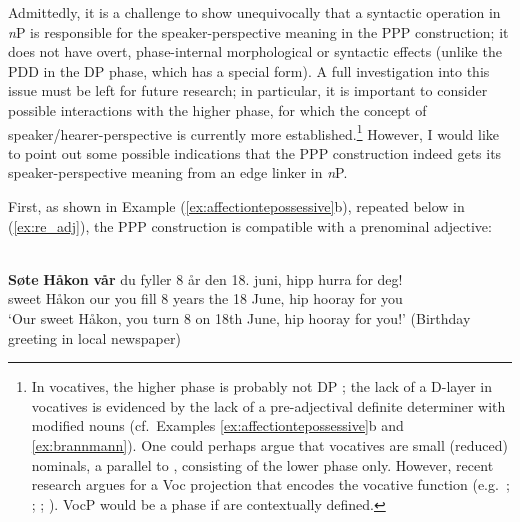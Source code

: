 \documentclass[output=paper]{langsci/langscibook}
\begin{document}
\noindent Admittedly, it is a challenge to show unequivocally that a syntactic
operation in \emph{n}P is  responsible for the speaker-perspective meaning in the PPP construction;  it does not have overt,
phase-internal morphological or syntactic effects (unlike the
\gls{PDD} in the DP
phase, which has a special form).  A full investigation into this
issue must be left for future research; in particular, it is important to
consider possible interactions with the higher phase, for which the concept of
speaker/hearer-perspective is currently more established.\footnote{In
    vocatives, the higher phase is probably not DP
    \citep{Longobardi1994}; the lack of a D-layer in  vocatives
    is evidenced by the lack of a pre-adjectival definite determiner with
    modified nouns (cf.\ Examples \ref{ex:affectiontepossessive}b and
    \ref{ex:brannmann}).  One could perhaps  argue that vocatives are small
    (reduced) nominals, a parallel to 
    \citep{Pereltsvaig2006}, consisting of the lower phase only.
    However, recent research argues for a Voc projection that encodes the
    vocative function (e.g.\ \citealt{hill2007vocatives, hill2013vocatives};
    \citealt{espinal2013vocatives}; \citealt{stavrou2013aboutthevocative};
\citealt{julien2014vokativar, julien2016predicationalvocatives}). VocP would be
a phase if  are contextually defined. } However, I would
like to point out some  possible indications that the PPP construction indeed
gets its speaker-perspective meaning from an edge linker in  \emph{n}P.

First, as shown in Example (\ref{ex:affectiontepossessive}b), repeated below in
(\ref{ex:re_adj}), the PPP construction is compatible with a prenominal
adjective:

\ea\label{ex:re_adj} \\
	\gll \textbf{S\o{}te } \textbf{H\aa{}kon} \textbf{v\aa{}r} du fyller 8 \aa{}r den 18. juni, hipp hurra for deg!\\
	sweet H\aa{}kon our you fill 8 years the 18 June, hip hooray for you\\
	\glt `Our sweet H\aa{}kon, you turn 8 on  18th  June, hip hooray for you!' (Birthday greeting in local newspaper)
\z
\end{document}

